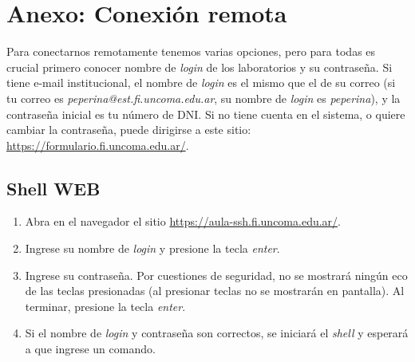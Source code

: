 \documentclass[12pt]{article}
\begin{document}

\clearpage
\section*{Anexo: Conexión remota}
\label{sec:anexoConexion}

Para conectarnos remotamente tenemos varias opciones, pero para todas es
crucial primero conocer nombre de \emph{login} de los laboratorios y su
contraseña. Si tiene e-mail institucional, el nombre de \emph{login} es el
mismo que el de su correo (si tu correo es
\emph{peperina@est.fi.uncoma.edu.ar}, su nombre de \emph{login} es
\emph{peperina}), y la contraseña inicial es tu número de DNI. Si no tiene
cuenta en el sistema, o quiere cambiar la contraseña, puede dirigirse a este
sitio: \url{https://formulario.fi.uncoma.edu.ar/}.

\subsection*{Shell WEB}

\begin{enumerate}
    \item Abra en el navegador el sitio
        \url{https://aula-ssh.fi.uncoma.edu.ar/}.

    \item Ingrese su nombre de \emph{login} y presione la tecla \emph{enter}.

    \item Ingrese su contraseña. Por cuestiones de seguridad, no se mostrará
        ningún eco de las teclas presionadas (al presionar teclas no se
        mostrarán en pantalla). Al terminar, presione la tecla 
        \emph{enter}.

    \item Si el nombre de \emph{login} y contraseña son correctos, se iniciará el
        \emph{shell} y esperará a que ingrese un comando.

\end{enumerate}
\end{document}
